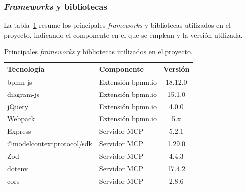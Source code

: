 \begin{center}
\hspace{0.8cm}%
\hspace{0.8cm}%
\hspace{0.8cm}%
\hspace{0.8cm}%
%
\end{center}

\subsubsection{\textit{Frameworks} y bibliotecas}

La tabla~\ref{tab:frameworks} resume los principales \textit{frameworks} y bibliotecas utilizados en el proyecto, indicando el componente en el que se emplean y la versión utilizada.

\begin{table}[ht]
\centering
\small
\begin{tabular}{|l|l|c|}
\hline
\rowcolor{gray!20} \textbf{Tecnología} & \textbf{Componente} & \textbf{Versión} \\
\hline
bpmn-js               & Extensión bpmn.io & 18.12.0 \\
\hline
diagram-js            & Extensión bpmn.io & 15.1.0 \\
\hline
jQuery                & Extensión bpmn.io & 4.0.0 \\
\hline
Webpack               & Extensión bpmn.io & 5.x \\
\hline
Express               & Servidor MCP      & 5.2.1 \\
\hline
@modelcontextprotocol/sdk & Servidor MCP  & 1.29.0 \\
\hline
Zod                   & Servidor MCP      & 4.4.3 \\
\hline
dotenv                & Servidor MCP      & 17.4.2 \\
\hline
cors                  & Servidor MCP      & 2.8.6 \\
\hline
\end{tabular}
\caption{Principales \textit{frameworks} y bibliotecas utilizados en el proyecto.}
\label{tab:frameworks}
\end{table}

